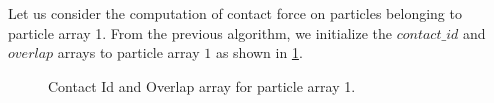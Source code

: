 Let us consider the computation of contact force on particles belonging to
particle array 1. From the previous algorithm, we initialize the $contact\_id$
and $overlap$ arrays to particle array $1$ as shown in \cref{fig:mb-2-pa-prev-algo}.
\begin{figure}[!htpb]
  \centering
  \caption{Contact Id and Overlap array for particle array 1.}
\label{fig:mb-2-pa-prev-algo}
\end{figure}

